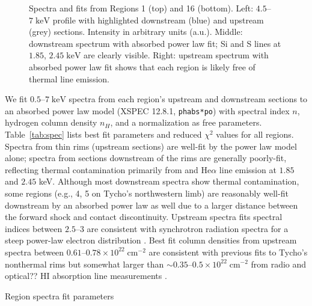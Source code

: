 \documentclass[iop, apj, numberedappendix, twocolappendix]{emulateapj}
\newcommand*{\mt}{\mathrm}
\newcommand*{\unit}[1]{\;\mt{#1}}  %
\newcommand*{\abt}{\mathord{\sim}} %
\begin{document}
\begin{figure*}
    \caption{Spectra and fits from Regions 1 (top) and 16 (bottom).
    Left: $4.5$--$7 \unit{keV}$
    profile with highlighted downstream (blue) and upstream (grey) sections.
    Intensity in arbitrary units (a.u.).  Middle: downstream spectrum with
    absorbed power law fit; Si and S lines at $1.85$, $2.45 \unit{keV}$ are
    clearly visible.  Right: upstream spectrum with absorbed power law fit
    shows that each region is likely free of thermal line emission.}
    \label{fig:spec}
\end{figure*}

We fit $0.5$--$7 \unit{keV}$ spectra from each region's upstream and downstream
sections to an absorbed power law model (XSPEC 12.8.1, \texttt{phabs*po}) with
spectral index $n$, hydrogen column density $n_H$, and a normalization as free
parameters.  Table~\ref{tab:spec} lists best fit parameters and reduced
$\chi^2$ values for all regions.  Spectra from thin rims (upstream sections)
are well-fit by the power law model alone; spectra from sections downstream of
the rims are generally poorly-fit, reflecting thermal contamination primarily
from  and  He$\alpha$ line emission at $1.85$ and $2.45$
keV.  Although most downstream spectra show thermal contamination, some regions
(e.g., 4, 5 on Tycho's northwestern limb) are reasonably well-fit downstream by
an absorbed power law as well due to a larger distance between the forward
shock and contact discontinuity.
Upstream spectra fits spectral indices between $2.5$--$3$ are consistent with
synchrotron radiation spectra for a steep power-law electron distribution
\citep{vink2012}. Best fit column densities from
upstream spectra between $0.61$--$0.78 \times 10^{22} \unit{cm^{-2}}$ are
consistent with previous fits to Tycho's nonthermal rims \citep{hwang2002} but
somewhat larger than $\abt0.35$--$0.5 \times 10^{22} \unit{cm^{-2}}$ from radio
and optical??  HI absorption line measurements \citep{black1984, albinson1986,
kothes2004}.

\begin{table}
    \scriptsize
    \centering
    \caption{Region spectra fit parameters\label{tab:spec}}
    
\end{table}
\end{document}
